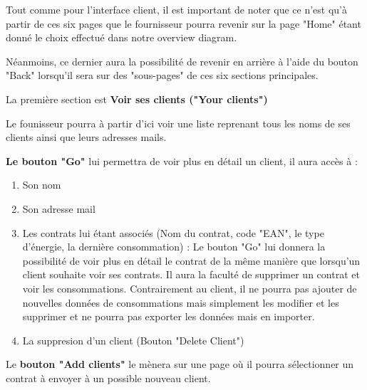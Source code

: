 \begin{flushleft}
Tout comme pour l'interface client, il est important de noter que ce n'est qu'à partir de ces six pages que le fournisseur pourra revenir sur la page "Home" étant donné le choix effectué dans notre overview diagram.
\end{flushleft}

\begin{flushleft}
Néanmoins, ce dernier aura la possibilité de revenir en arrière à l'aide du bouton "Back" lorsqu'il sera sur des "sous-pages" de ces six sections principales.
\end{flushleft}

\newpage

\begin{flushleft}
La première section est \textbf{Voir ses clients ("Your clients")}
\end{flushleft}

\begin{flushleft}
Le founisseur pourra à partir d'ici voir une liste reprenant tous les noms de ses clients ainsi que leurs adresses mails. 
\end{flushleft}

\begin{flushleft}
\textbf{Le bouton "Go"} lui permettra de voir plus en détail un client, il aura accès à :
\end{flushleft}
\begin{enumerate}
\item Son nom
\item Son adresse mail
\item Les contrats lui étant associés (Nom du contrat, code "EAN", le type d'énergie, la dernière consommation) : \newline
Le bouton "Go" lui donnera la possibilité de voir plus en détail le contrat de la même manière que lorsqu'un client souhaite voir ses contrats.\newline
Il aura la faculté de supprimer un contrat et voir les consommations.\newline
Contrairement au client, il ne pourra pas ajouter de nouvelles données de consommations mais simplement les modifier et les supprimer et ne pourra pas exporter les données mais en importer.
\item La suppresion d'un client (Bouton "Delete Client")
\end{enumerate}

\begin{flushleft}
Le \textbf{bouton "Add clients"} le mènera sur une page où il pourra sélectionner un contrat à envoyer à un possible nouveau client.
\end{flushleft}

